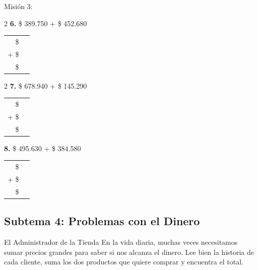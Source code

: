 \documentclass[12pt, letterpaper]{article}
\newcommand{\boxfill}[1][1.2cm]{\tcbox[on line, size=minimal, colframe=valdark!80, colback=white, boxrule=0.5pt, arc=1mm, boxsep=2pt, left=2pt, right=2pt, top=2pt, bottom=2pt]{\makebox[#1]{\vphantom{M}}}}
\begin{document}
\begin{practica}{Misión 3: }
\begin{multicols}{2}
    \textbf{6.} \$ 389.750 + \$ 452.680 \\[0.3cm]
    \begin{tabular}{rr}
      \$ & \boxfill[2cm] \\
    + \$ & \boxfill[2cm] \\
    \hline
      \$ & \boxfill[2cm]
    \end{tabular}
\end{multicols}

\vspace{0.5cm}
\begin{multicols}{2}
    \textbf{7.} \$ 678.940 + \$ 145.290 \\[0.3cm]
    \begin{tabular}{rr}
      \$ & \boxfill[2cm] \\
    + \$ & \boxfill[2cm] \\
    \hline
      \$ & \boxfill[2cm]
    \end{tabular}

    \textbf{8.} \$ 495.630 + \$ 384.580 \\[0.3cm]
    \begin{tabular}{rr}
      \$ & \boxfill[2cm] \\
    + \$ & \boxfill[2cm] \\
    \hline
      \$ & \boxfill[2cm]
    \end{tabular}
\end{multicols}
\end{practica}


\vspace{0.5cm}
\noindent\begin{minipage}{\textwidth}
\subsection*{Subtema 4: Problemas con el Dinero}

\begin{concepto}{El Administrador de la Tienda}
En la vida diaria, muchas veces necesitamos sumar precios grandes para saber si nos alcanza el dinero. Lee bien la historia de cada cliente, suma los dos productos que quiere comprar y encuentra el total.
\end{concepto}
\end{minipage}
\end{document}
